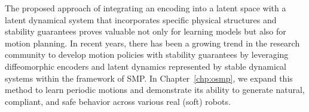 The proposed approach of integrating an encoding into a latent space with a latent dynamical system that incorporates specific physical structures and stability guarantees proves valuable not only for learning models but also for motion planning. In recent years, there has been a growing trend in the research community to develop motion policies with stability guarantees by leveraging diffeomorphic encoders and latent dynamics represented by stable dynamical systems within the framework of \gls{SMP}\citep{rana2020euclideanizing, perez2023stable, zhi2024teaching}. In Chapter~\ref{chp:osmp}, we expand this method to learn periodic motions and demonstrate its ability to generate natural, compliant, and safe behavior across various real (soft) robots.

